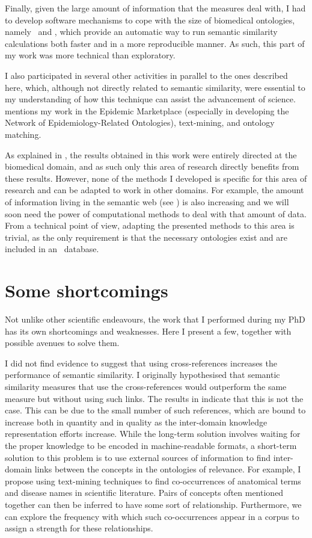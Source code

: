Finally, given the large amount of information that the measures deal with, I had to develop software mechanisms to cope with the size of biomedical ontologies, namely \owlsql\ and \mossy, which provide an automatic way to run semantic similarity calculations both faster and in a more reproducible manner. As such, this part of my work was more technical than exploratory.

I also participated in several other activities in parallel to the ones described here, which, although not directly related to semantic similarity, were essential to my understanding of how this technique can assist the advancement of science.  mentions my work in the Epidemic Marketplace (especially in developing the Network of Epidemiology-Related Ontologies), text-mining, and ontology matching.

As explained in , the results obtained in this work were entirely directed at the biomedical domain, and as such only this area of research directly benefits from these results. However, none of the methods I developed is specific for this area of research and can be adapted to work in other domains. For example, the amount of information living in the semantic web (see ) is also increasing and we will soon need the power of computational methods to deal with that amount of data. From a technical point of view, adapting the presented methods to this area is trivial, as the only requirement is that the necessary ontologies exist and are included in an \owlsql\ database.


\section{Some shortcomings} \label{sec:conclusions/criticism}

Not unlike other scientific endeavours, the work that I performed during my PhD has its own shortcomings and weaknesses. Here I present a few, together with possible avenues to solve them.

I did not find evidence to suggest that using cross-references increases the performance of semantic similarity. I originally hypothesised that semantic similarity measures that use the cross-references would outperform the same measure but without using such links. The results in  indicate that this is not the case. This can be due to the small number of such references, which are bound to increase both in quantity and in quality as the inter-domain knowledge representation efforts increase. While the long-term solution involves waiting for the proper knowledge to be encoded in machine-readable formats, a short-term solution to this problem is to use external sources of information to find inter-domain links between the concepts in the ontologies of relevance. For example, I propose using text-mining techniques to find co-occurrences of anatomical terms and disease names in scientific literature. Pairs of concepts often mentioned together can then be inferred to have some sort of relationship. Furthermore, we can explore the frequency with which such co-occurrences appear in a corpus to assign a strength for these relationships.

